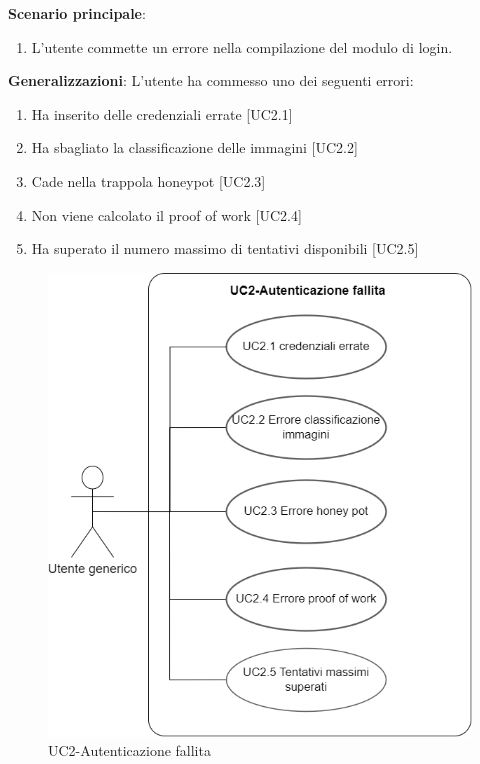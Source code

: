 \textbf{Scenario principale}:
\begin{enumerate}
   \item L’utente commette un errore nella compilazione del modulo di login.
\end{enumerate}

\textbf{Generalizzazioni}: L'utente ha commesso uno dei seguenti errori:
\begin{enumerate}
	\item Ha inserito delle credenziali errate [UC2.1]
	\item Ha sbagliato la classificazione delle immagini [UC2.2]
	\item Cade nella trappola honeypot [UC2.3]
	\item Non viene calcolato il proof of work [UC2.4]
	\item Ha superato il numero massimo di tentativi disponibili [UC2.5]
\end{enumerate}

\begin{figure}[H]
    \centering
    \includegraphics[scale=0.4]{img/Autenticazione_fallita.png}
    \caption{UC2-Autenticazione fallita}
\end{figure}

